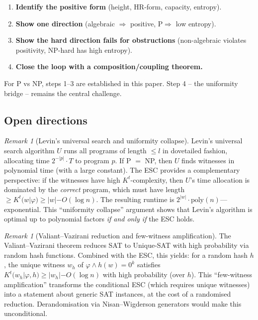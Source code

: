 \documentclass[aps,prd,twocolumn,superscriptaddress,nofootinbib]{revtex4-2}
\theoremstyle{definition}
\theoremstyle{remark}
\newtheorem{remark}[theorem]{Remark}
\newcommand{\PP}{\mathrm{P}}
\begin{document}
\begin{enumerate}
\item \textbf{Identify the positive form} (height, HR-form, capacity, entropy).
\item \textbf{Show one direction} (algebraic $\Rightarrow$ positive, $\PP \Rightarrow$ low entropy).
\item \textbf{Show the hard direction fails for obstructions} (non-algebraic violates positivity, NP-hard has high entropy).
\item \textbf{Close the loop with a composition/coupling theorem.}
\end{enumerate}

For P vs NP, steps 1--3 are established in this paper. Step 4 -- the uniformity bridge -- remains the central challenge.

\subsection{Open directions}

\begin{remark}[Levin's universal search and uniformity collapse]
\label{rem:levin-uniformity}
Levin's universal search algorithm $U$ runs all programs of length $\leq l$ in dovetailed fashion, allocating time $2^{-|p|} \cdot T$ to program $p$. If P $=$ NP, then $U$ finds witnesses in polynomial time (with a large constant). The ESC provides a complementary perspective: if the witnesses have high $K^t$-complexity, then $U$'s time allocation is dominated by the \emph{correct} program, which must have length $\geq K^t(w|\varphi) \geq |w| - O(\log n)$. The resulting runtime is $2^{|w|} \cdot \mathrm{poly}(n)$---exponential. This ``uniformity collapse'' argument shows that Levin's algorithm is optimal up to polynomial factors \emph{if and only if} the ESC holds.
\end{remark}

\begin{remark}[Valiant--Vazirani reduction and few-witness amplification]
\label{rem:valiant-vazirani}
The Valiant--Vazirani theorem reduces SAT to Unique-SAT with high probability via random hash functions. Combined with the ESC, this yields: for a random hash $h$, the unique witness $w_h$ of $\varphi \wedge h(w) = 0^k$ satisfies $K^t(w_h | \varphi, h) \geq |w_h| - O(\log n)$ with high probability (over $h$). This ``few-witness amplification'' transforms the conditional ESC (which requires unique witnesses) into a statement about generic SAT instances, at the cost of a randomised reduction. Derandomisation via Nisan--Wigderson generators would make this unconditional.
\end{remark}
\end{document}
